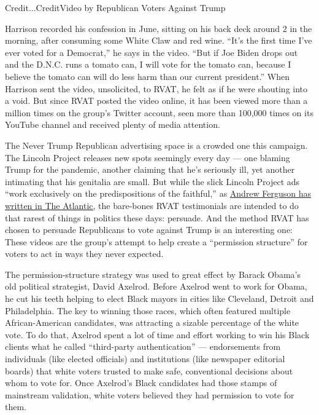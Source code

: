 Credit...CreditVideo by Republican Voters Against Trump

Harrison recorded his confession in June, sitting on his back deck
around 2 in the morning, after consuming some White Claw and red wine.
``It's the first time I've ever voted for a Democrat,'' he says in the
video. ``But if Joe Biden drops out and the D.N.C. runs a tomato can, I
will vote for the tomato can, because I believe the tomato can will do
less harm than our current president.'' When Harrison sent the video,
unsolicited, to RVAT, he felt as if he were shouting into a void. But
since RVAT posted the video online, it has been viewed more than a
million times on the group's Twitter account, seen more than 100,000
times on its YouTube channel and received plenty of media attention.

The Never Trump Republican advertising space is a crowded one this
campaign. The Lincoln Project releases new spots seemingly every day ---
one blaming Trump for the pandemic, another claiming that he's seriously
ill, yet another intimating that his genitalia are small. But while the
slick Lincoln Project ads ``work exclusively on the predispositions of
the faithful,'' as
\href{https://www.theatlantic.com/ideas/archive/2020/06/tactics-lincoln-project/613636/}{Andrew
Ferguson has written in The Atlantic,} the bare-bones RVAT testimonials
are intended to do that rarest of things in politics these days:
persuade. And the method RVAT has chosen to persuade Republicans to vote
against Trump is an interesting one: These videos are the group's
attempt to help create a ``permission structure'' for voters to act in
ways they never expected.

The permission-structure strategy was used to great effect by Barack
Obama's old political strategist, David Axelrod. Before Axelrod went to
work for Obama, he cut his teeth helping to elect Black mayors in cities
like Cleveland, Detroit and Philadelphia. The key to winning those
races, which often featured multiple African-American candidates, was
attracting a sizable percentage of the white vote. To do that, Axelrod
spent a lot of time and effort working to win his Black clients what he
called ``third-party authentication'' --- endorsements from individuals
(like elected officials) and institutions (like newspaper editorial
boards) that white voters trusted to make safe, conventional decisions
about whom to vote for. Once Axelrod's Black candidates had those stamps
of mainstream validation, white voters believed they had permission to
vote for them.

